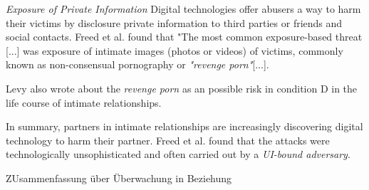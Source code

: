 \textit{Exposure of Private Information}
Digital technologies offer abusers a way to harm their victims by disclosure private information to third parties or friends and social contacts. Freed et al. found that "The most common exposure-based threat [...] was exposure of intimate images (photos or videos) of victims, commonly known as non-consensual pornography or \textit{"revenge porn"}[...].

Levy also wrote about the \textit{revenge porn} as an possible risk in condition D in the life course of intimate relationships.

In summary, partners in intimate relationships are increasingly discovering digital technology to harm their partner. Freed et al. \cite{freed2018stalker} found that the attacks were technologically unsophisticated and often carried out by a \textit{UI-bound adversary}.

ZUsammenfassung über Überwachung in Beziehung













